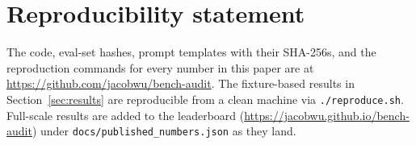 \documentclass[11pt]{article}
\begin{document}
\section{Reproducibility statement}

The code, eval-set hashes, prompt templates with their SHA-256s, and the
reproduction commands for every number in this paper are at
\url{https://github.com/jacobwu/bench-audit}. The fixture-based results
in Section~\ref{sec:results} are reproducible from a clean machine via
\texttt{./reproduce.sh}. Full-scale results are added to the leaderboard
(\url{https://jacobwu.github.io/bench-audit}) under
\texttt{docs/published\_numbers.json} as they land.


\end{document}
